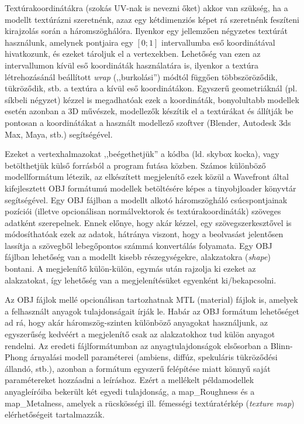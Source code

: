 Textúrakoordinátákra (szokás UV-nak is nevezni őket) akkor van szükség, ha a modellt textúrázni szeretnénk, azaz egy kétdimenziós képet rá szeretnénk feszíteni kirajzolás során a háromszöghálóra. Ilyenkor egy jellemzően négyzetes textúrát használunk, amelynek pontjaira egy \([0; 1]\) intervallumba eső koordinátával hivatkozunk, és ezeket tároljuk el a vertexekben. Lehetőség van ezen az intervallumon kívül eső koordináták használatára is, ilyenkor a textúra létrehozásánál beállított \textit{wrap} (,,burkolási'') módtól függően többszöröződik, tükröződik, stb. a textúra a kívül eső koordinátákon. Egyszerű geometriáknál (pl. síkbeli négyzet) kézzel is megadhatóak ezek a koordináták, bonyolultabb modellek esetén azonban a 3D művészek, modellezők készítik el a textúrákat és állítják be pontosan a koordinátákat a használt modellező szoftver (Blender, Autodesk 3ds Max, Maya, stb.) segítségével.

Ezeket a vertexhalmazokat ,,beégethetjük'' a kódba (ld. skybox kocka), vagy betölthetjük külső forrásból a program futása közben. Számos különböző modellformátum létezik, az elkészített megjelenítő ezek közül a Wavefront által kifejlesztett OBJ formátumú modellek betöltésére képes a tinyobjloader könyvtár segítségével. Egy OBJ fájlban a modellt alkotó háromszögháló csúcspontjainak pozíciói (illetve opcionálisan normálvektorok és textúrakoordináták) szöveges adatként szerepelnek. Ennek előnye, hogy akár kézzel, egy szövegszerkesztővel is módosíthatóak ezek az adatok, hátránya viszont, hogy a beolvasást jelentősen lassítja a szövegből lebegőpontos számmá konvertálás folyamata. Egy OBJ fájlban lehetőség van a modellt kisebb részegységekre, alakzatokra (\textit{shape}) bontani. A megjelenítő külön-külön, egymás után rajzolja ki ezeket az alakzatokat, így lehetőség van a megjelenítésüket egyenként ki/bekapcsolni.

Az OBJ fájlok mellé opcionálisan tartozhatnak MTL (material) fájlok is, amelyek a felhasznált anyagok tulajdonságait írják le. Habár az OBJ formátum lehetőséget ad rá, hogy akár háromszög-szinten különböző anyagokat használjunk, az egyszerűség kedvéért a megjelenítő csak az alakzatokhoz tud külön anyagot rendelni. Az eredeti fájlformátumban az anyagtulajdonságok elsősorban a Blinn-Phong árnyalási modell paraméterei (ambiens, diffúz, spekuláris tükröződési állandó, stb.), azonban a formátum egyszerű felépítése miatt könnyű saját paramétereket hozzáadni a leíráshoz. Ezért a mellékelt példamodellek anyagleíróiba bekerült két egyedi tulajdonság, a map\_Roughness és a map\_Metalness, amelyek a rücskösségi ill. fémességi textúratérkép (\textit{texture map}) elérhetőségeit tartalmazzák.

